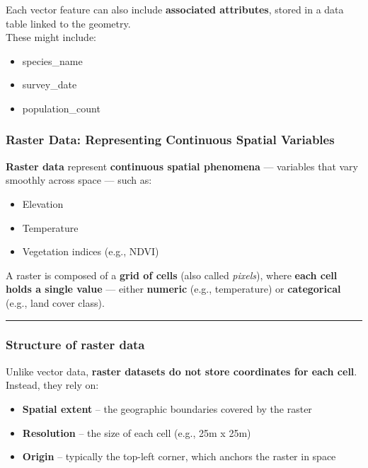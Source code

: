 \documentclass[
]{book}
\providecommand{\tightlist}{%
  \setlength{\itemsep}{0pt}\setlength{\parskip}{0pt}}
\begin{document}
Each vector feature can also include \textbf{associated attributes},
stored in a data table linked to the geometry.\\
These might include:

\begin{itemize}
\tightlist
\item
  species\_name
\item
  survey\_date
\item
  population\_count
\end{itemize}

\subsubsection{Raster Data: Representing Continuous Spatial
Variables}\label{raster-data-representing-continuous-spatial-variables}

\textbf{Raster data} represent \textbf{continuous spatial phenomena} ---
variables that vary smoothly across space --- such as:

\begin{itemize}
\tightlist
\item
  Elevation
\item
  Temperature
\item
  Vegetation indices (e.g., NDVI)
\end{itemize}

A raster is composed of a \textbf{grid of cells} (also called
\emph{pixels}), where \textbf{each cell holds a single value} --- either
\textbf{numeric} (e.g., temperature) or \textbf{categorical} (e.g., land
cover class).

\begin{center}\rule{0.5\linewidth}{0.5pt}\end{center}

\subsubsection{Structure of raster data}\label{structure-of-raster-data}

Unlike vector data, \textbf{raster datasets do not store coordinates for
each cell}. Instead, they rely on:

\begin{itemize}
\tightlist
\item
  \textbf{Spatial extent} -- the geographic boundaries covered by the
  raster\\
\item
  \textbf{Resolution} -- the size of each cell (e.g., 25m x 25m)\\
\item
  \textbf{Origin} -- typically the top-left corner, which anchors the
  raster in space
\end{itemize}
\end{document}
